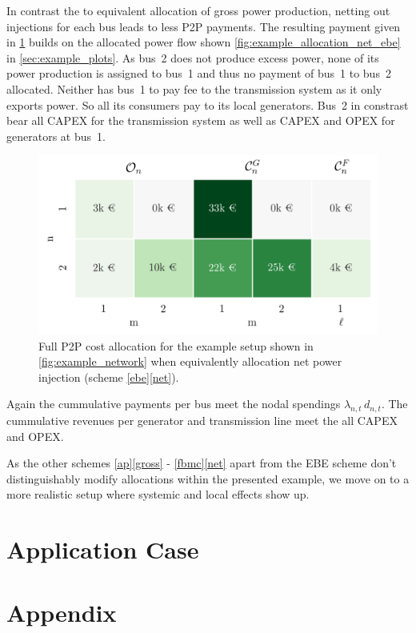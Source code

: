 \documentclass[11pt,twocolumn]{article}
\newcommand{\demand}[1][n]{d_{#1,t}}
\newcommand{\lmp}[1][n]{\lambda_{#1,t}}
\begin{document}
In contrast the to equivalent allocation of gross power production, netting out injections for each bus leads to less P2P payments. The resulting payment given in \cref{fig:example_payoff_net_ebe} builds on the allocated power flow shown \cref{fig:example_allocation_net_ebe} in \cref{sec:example_plots}. As bus~2 does not produce excess power, none of its power production is assigned to bus~1 and thus no payment of bus~1 to bus~2 allocated. Neither has bus~1 to pay fee to the transmission system as it only exports power. So all its consumers pay to its local generators. Bus~2 in constrast bear all CAPEX for the transmission system as well as CAPEX and OPEX for generators at bus~1.
\begin{figure}[h]
\centering
\includegraphics[width=\linewidth]{example_payoff_net_ebe.png}
\caption{Full P2P cost allocation for the example setup shown in \cref{fig:example_network} when equivalently allocation net power injection (scheme \ref{ebe}\ref{net}).}
\label{fig:example_payoff_net_ebe}
\end{figure}

Again the cummulative payments per bus meet the nodal spendings $\lmp \, \demand$. The cummulative revenues per generator and transmission line meet the all CAPEX and OPEX.  

As the other schemes \ref{ap}\ref{gross} - \ref{fbmc}\ref{net} apart from the EBE scheme don't distinguishably modify allocations within the presented example, we move on to a more realistic setup where systemic and local effects show up.


\section{Application Case}

\clearpage
\appendix

\section{Appendix}
\end{document}
